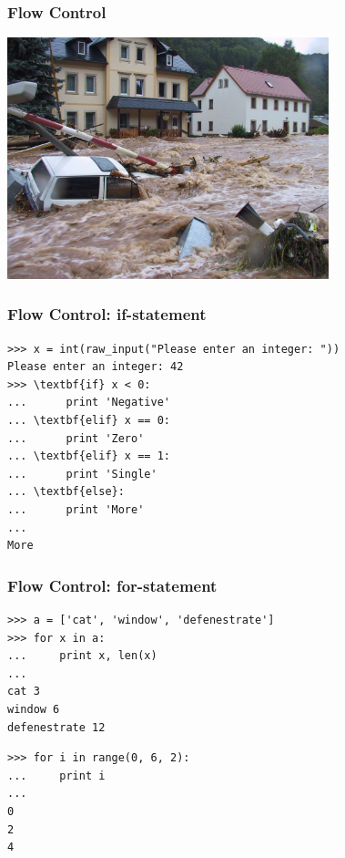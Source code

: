 \documentclass[t,10pt,compress=false,usepdftitle=false]{beamer}
\begin{document}
\begin{frame}[fragile]
    \frametitle{Flow Control}
    \begin{center}
      \includegraphics[width=0.7\textwidth]{flowcontrol.jpg}
    \end{center}
\end{frame}


\begin{frame}[fragile]
    \frametitle{Flow Control: if-statement}
    \begin{myColorBox}{0.9}{}
\begin{verbatim}
>>> x = int(raw_input("Please enter an integer: "))
Please enter an integer: 42
>>> \textbf{if} x < 0:
...      print 'Negative'
... \textbf{elif} x == 0:
...      print 'Zero'
... \textbf{elif} x == 1:
...      print 'Single'
... \textbf{else}:
...      print 'More'
...
More
\end{verbatim}
    \end{myColorBox}
\end{frame}


\begin{frame}[fragile]
    \frametitle{Flow Control: for-statement}
    \begin{myColorBox}{0.9}{}
\begin{verbatim}
>>> a = ['cat', 'window', 'defenestrate']
>>> for x in a:
...     print x, len(x)
...
cat 3
window 6
defenestrate 12
\end{verbatim}
    \end{myColorBox}
    \pause
    \begin{myColorBox}{0.9}{}
\begin{verbatim}
>>> for i in range(0, 6, 2):
...     print i
...
0
2
4
\end{verbatim}
    \end{myColorBox}
\end{frame}
\end{document}
